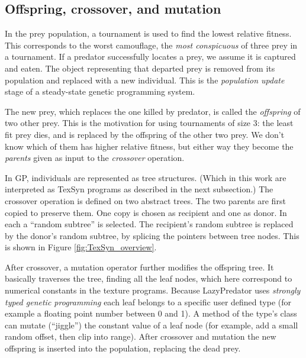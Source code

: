 \documentclass[sigconf]{acmart}
\newcommand{\jargon}[1]{\textit{#1}}
\begin{document}

\subsection{Offspring, crossover, and mutation}
In the prey population, a tournament is used to find the lowest relative fitness. This corresponds to the worst camouflage, the \jargon{most conspicuous} of three prey in a tournament. If a predator successfully locates a prey, we assume it is captured and eaten. The object representing that departed prey is removed from its population and replaced with a new individual. This is the \jargon{population update} stage of a steady-state genetic programming system.
\par
The new prey, which replaces the one killed by predator, is called the \jargon{offspring} of two other prey. This is the motivation for using tournaments of size 3: the least fit prey dies, and is replaced by the offspring of the other two prey. We don't know which of them has higher relative fitness, but either way they become the \jargon{parents} given as input to the \jargon{crossover} operation.
\par
In GP, individuals are represented as tree structures. (Which in this work are interpreted as TexSyn programs as described in the next subsection.) The crossover operation is defined on two abstract trees. The two parents are first copied to preserve them. One copy is chosen as recipient and one as donor. In each a “random subtree” is selected. The recipient's random subtree is replaced by the donor's random subtree, by splicing the pointers between tree nodes. This is shown in Figure \ref{fig:TexSyn_overview}.
\par
After crossover, a mutation operator further modifies the offspring tree. It basically traverses the tree, finding all the leaf nodes, which here correspond to numerical constants in the texture programs. Because LazyPredator uses \jargon{strongly typed genetic programming} \cite{montana_strongly_1995} each leaf belongs to a specific user defined type (for example a floating point number between 0 and 1). A method of the type's class can mutate (“jiggle”) the constant value of a leaf node (for example, add a small random offset, then clip into range). After crossover and mutation the new offspring is inserted into the population, replacing the dead prey.
\par

\end{document}
